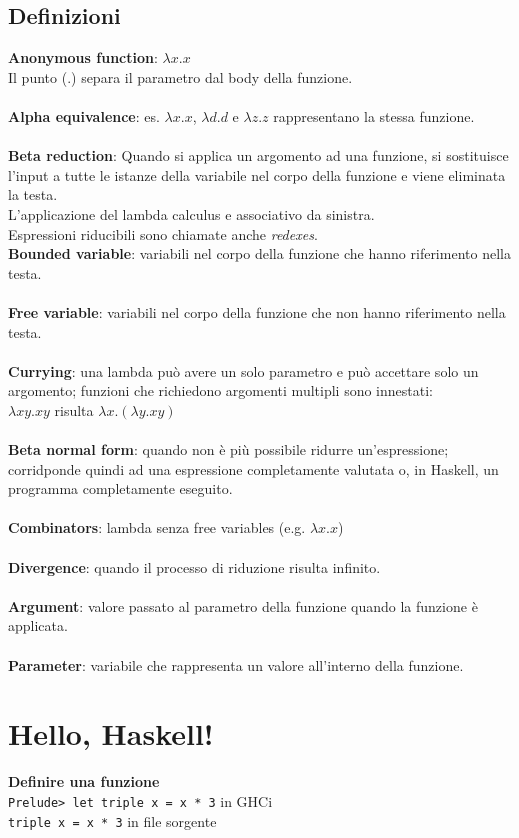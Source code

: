 \documentclass[a4paper, 12pt]{book}
\begin{document}
    \section{Definizioni}
    \textbf{Anonymous function}: \(\lambda x.x\) \\
    Il punto (\(.\)) separa il parametro dal body della funzione.\\
    \\
    \textbf{Alpha equivalence}: es. \(\lambda x.x\), \(\lambda d.d\) e \(\lambda z.z\) rappresentano la stessa funzione. \\
    \\
    \textbf{Beta reduction}: Quando si applica un argomento ad una funzione, si sostituisce l'input a tutte le istanze della variabile nel corpo della funzione e viene eliminata la testa.\\
    L'applicazione del lambda calculus e associativo da sinistra.\\
    Espressioni riducibili sono chiamate anche \textit{redexes}.
    \\
    \textbf{Bounded variable}: variabili nel corpo della funzione che hanno riferimento nella testa. \\
    \\
    \textbf{Free variable}: variabili nel corpo della funzione che non hanno riferimento nella testa. \\
    \\
    \textbf{Currying}: una lambda può avere un solo parametro e può accettare solo un argomento; funzioni che richiedono argomenti multipli sono innestati: \\
    \(\lambda xy.xy\) risulta \(\lambda x.(\lambda y.xy)\)\\
    \\
    \textbf{Beta normal form}: quando non è più possibile ridurre un'espressione; corridponde quindi ad una espressione completamente valutata o, in Haskell, un programma completamente eseguito. \\
    \\
    \textbf{Combinators}: lambda senza free variables (e.g. \(\lambda x.x\)) \\
    \\
    \textbf{Divergence}: quando il processo di riduzione risulta infinito.\\
    \\
    \textbf{Argument}: valore passato al parametro della funzione quando la funzione è applicata.\\
    \\
    \textbf{Parameter}: variabile che rappresenta un valore all'interno della funzione.\\

\chapter{Hello, Haskell!}
    \textbf{Definire una funzione}\\
    \texttt{Prelude> let triple x = x * 3} in GHCi\\
    \texttt{triple x = x * 3} in file sorgente\\
\end{document}
